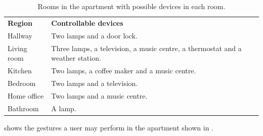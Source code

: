 \begin{table}[h!]
\centering
\caption{Rooms in the apartment with possible devices in each room.}
\label{tbl:analysis:scenario:rooms}
\begin{tabular}{ll}
\textbf{Region} & \textbf{Controllable devices}                                                 \\
Hallway         & Two lamps and a door lock.                                                    \\
Living room     & Three lamps, a television, a music centre, a thermostat and a weather station.\\
Kitchen         & Two lamps, a coffee maker and a music centre.                                 \\
Bedroom         & Two lamps and a television.                                                   \\
Home office     & Two lamps and a music centre.                                                 \\
Bathroom        & A lamp.                                                                      
\end{tabular}
\end{table}

 shows the gestures a user may perform in the apartment shown in .

